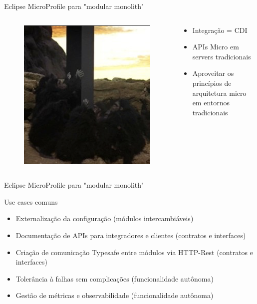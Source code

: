 \documentclass[aspectratio=169]{beamer}
\begin{document}
\begin{frame}{Eclipse MicroProfile para "modular monolith"}

\begin{columns}
\begin{column}{0.5\textwidth}
	\begin{figure}
		\centering
		\includegraphics[width=0.7\linewidth]{Images/space}
	\end{figure}
	\end{column}
	\begin{column}{0.5\textwidth}  %
		\begin{itemize}
        	\item Integração = CDI
            \item APIs Micro em servers tradicionais
            \item Aproveitar os princípios de arquitetura micro em entornos tradicionais
        \end{itemize}


	\end{column}
\end{columns}
\end{frame}

\begin{frame}{Eclipse MicroProfile para "modular monolith"}

Use cases comuns

\begin{itemize}
    \item Externalização da configuração (módulos intercambiáveis)
    \item Documentação de APIs para integradores e clientes (contratos e interfaces)
    \item Criação de comunicação Typesafe entre módulos via HTTP-Rest (contratos e interfaces)
    \item Tolerância à falhas sem complicações (funcionalidade autônoma)
    \item Gestão de métricas e observabilidade (funcionalidade autônoma)
\end{itemize}
\end{frame}
\end{document}

